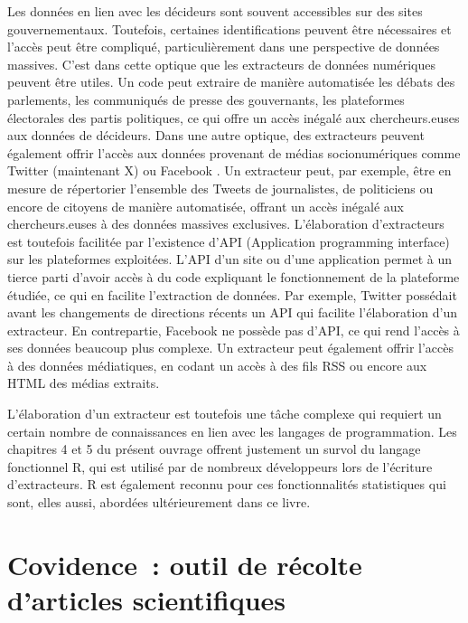 \documentclass[
  letterpaper,
]{scrbook}
\begin{document}
Les données en lien avec les décideurs sont souvent accessibles sur des
sites gouvernementaux. Toutefois, certaines identifications peuvent être
nécessaires et l'accès peut être compliqué, particulièrement dans une
perspective de données massives. C'est dans cette optique que les
extracteurs de données numériques peuvent être utiles. Un code peut
extraire de manière automatisée les débats des parlements, les
communiqués de presse des gouvernants, les plateformes électorales des
partis politiques, ce qui offre un accès inégalé aux chercheurs.euses
aux données de décideurs. Dans une autre optique, des extracteurs
peuvent également offrir l'accès aux données provenant de médias
socionumériques comme Twitter (maintenant X) ou Facebook . Un extracteur
peut, par exemple, être en mesure de répertorier l'ensemble des Tweets
de journalistes, de politiciens ou encore de citoyens de manière
automatisée, offrant un accès inégalé aux chercheurs.euses à des données
massives exclusives. L'élaboration d'extracteurs est toutefois facilitée
par l'existence d'API (Application programming interface) sur les
plateformes exploitées. L'API d'un site ou d'une application permet à un
tierce parti d'avoir accès à du code expliquant le fonctionnement de la
plateforme étudiée, ce qui en facilite l'extraction de données. Par
exemple, Twitter possédait avant les changements de directions récents
un API qui facilite l'élaboration d'un extracteur. En contrepartie,
Facebook ne possède pas d'API, ce qui rend l'accès à ses données
beaucoup plus complexe. Un extracteur peut également offrir l'accès à
des données médiatiques, en codant un accès à des fils RSS ou encore aux
HTML des médias extraits.

L'élaboration d'un extracteur est toutefois une tâche complexe qui
requiert un certain nombre de connaissances en lien avec les langages de
programmation. Les chapitres 4 et 5 du présent ouvrage offrent justement
un survol du langage fonctionnel R, qui est utilisé par de nombreux
développeurs lors de l'écriture d'extracteurs. R est également reconnu
pour ces fonctionnalités statistiques qui sont, elles aussi, abordées
ultérieurement dans ce livre.

\hypertarget{covidence-outil-de-ruxe9colte-darticles-scientifiques}{%
\section{\texorpdfstring{\textbf{Covidence~: outil de récolte d'articles
scientifiques}}{Covidence~: outil de récolte d'articles scientifiques}}\label{covidence-outil-de-ruxe9colte-darticles-scientifiques}}
\end{document}
